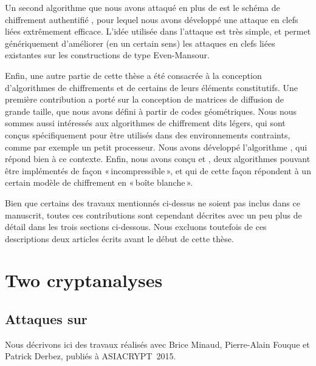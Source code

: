 Un second algorithme que nous avons attaqué en plus de \shaone est le schéma de chiffrement authentifié \proestotr, pour lequel nous avons développé une attaque en clefs liées
extrêmement efficace. L'idée utilisée dans l'attaque est très simple, et permet génériquement d'améliorer (en un certain sens) les attaques en clefs liées existantes sur les constructions
de type Even-Mansour.

\medskip

Enfin, une autre partie de cette thèse a été consacrée à la conception d'algorithmes de chiffrements et de certains de leurs éléments constitutifs.
Une première contribution a porté sur la conception de matrices de diffusion de grande taille, que nous avons défini à partir de codes géométriques.
Nous nous sommes aussi intéressés aux algorithmes de chiffrement dits légers, qui sont conçus spécifiquement pour être utilisés dans des environnements
contraints, comme par exemple un petit processeur. Nous avons développé l'algorithme \fly, qui répond bien à ce contexte.
Enfin, nous avons conçu \pc et \cdb, deux algorithmes pouvant être implémentés de façon «\,incompressible\,», et qui de cette façon répondent à un certain modèle
de chiffrement en «\,boîte blanche\,». 

\bigskip

Bien que certains des travaux mentionnés ci-dessus ne soient pas inclus dans ce manuscrit, toutes ces contributions sont cependant
décrites avec un peu plus de détail dans les trois sections ci-dessous. Nous excluons toutefois de ces descriptions deux articles écrits avant le début de cette thèse.

\section[Deux cryptanalyses]{Two cryptanalyses}

\subsection{Attaques sur \asasa \cite{DBLP:conf/asiacrypt/MinaudDFK15}}
Nous décrivons ici des travaux réalisés avec Brice Minaud, Pierre-Alain Fouque et Patrick Derbez, publiés à ASIACRYPT~2015.

\medskip

